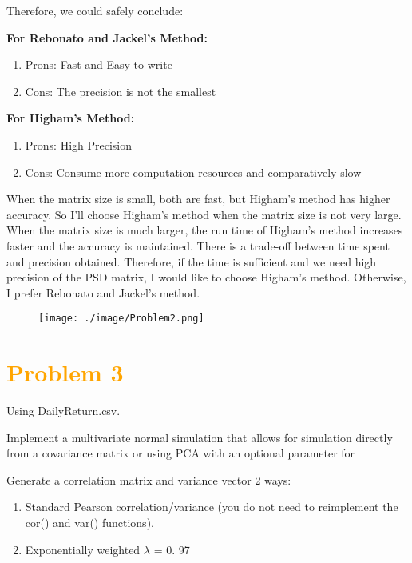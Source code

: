 \documentclass[11pt,en]{elegantpaper}
\begin{document}
Therefore, we could safely conclude:

\textbf{For Rebonato and Jackel's Method:}
\begin{enumerate}
 \item Prons: Fast and Easy to write
 \item Cons: The precision is not the smallest
\end{enumerate}

\textbf{For Higham's Method:}
\begin{enumerate}
 \item Prons: High Precision
 \item Cons: Consume more computation resources and comparatively slow
\end{enumerate}

When the matrix size is small, both are fast, but Higham's method has higher accuracy. 
So I'll choose Higham's method when the matrix size is not very large. When the matrix size is much larger, 
the run time of Higham's method increases faster and the accuracy is maintained. There is a trade-off between 
time spent and precision obtained. Therefore, if the time is sufficient and we need high precision of the 
PSD matrix, I would like to choose Higham's method. Otherwise, I prefer Rebonato and Jackel's method.

\begin{figure}[htbp] 
    \centering 
    \texttt{[image: ./image/Problem2.png]} 
\end{figure}


\newpage

\section*{\textcolor{orange}{Problem 3}}

Using DailyReturn.csv.

Implement a multivariate normal simulation that allows for simulation directly from a covariance matrix or using PCA with an optional parameter for %

Generate a correlation matrix and variance vector 2 ways:
\begin{enumerate}
    \item Standard Pearson correlation/variance (you do not need to reimplement the cor() and var() functions).
    \item Exponentially weighted $\lambda$ = 0. 97
\end{enumerate}
\end{document}
